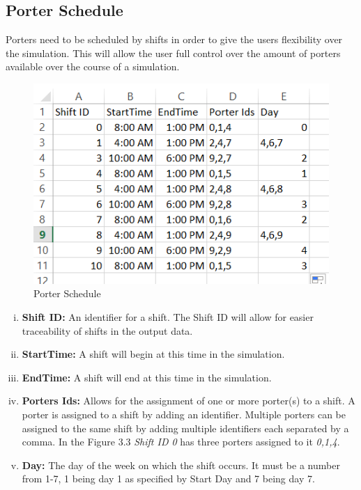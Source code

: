 \documentclass[paper=letter, fontsize=10pt]{scrartcl}
\numberwithin{equation}{section}		%
\numberwithin{figure}{section}			%
\numberwithin{table}{section}				%
\begin{document}
	\subsection{Porter Schedule}
	Porters need to be scheduled by shifts in order to give the users flexibility over the simulation.  This will allow the user full control over the amount of porters available over the course of a simulation.
	
	\begin{figure}[!htbp]
	\begin{center}
		\includegraphics[width=1\columnwidth, height=0.5\textheight, keepaspectratio]{Schedule.png}
		\caption{Porter Schedule}
	\end{center}
	\end{figure}
	
	\begin{enumerate}[(i)]
		\item \textbf{Shift ID:} An identifier for a shift.  The Shift ID will allow for easier traceability of shifts in the output data.
		\item \textbf{StartTime:} A shift will begin at this time in the simulation.
		\item \textbf{EndTime:} A shift will end at this time in the simulation.
		\item \textbf{Porters Ids:} Allows for the assignment of one or more porter(s) to a shift.  A porter is assigned to a shift by adding an identifier.  Multiple porters can be assigned to the same shift by adding multiple identifiers each separated by a comma.  In the Figure 3.3 \textit{Shift ID 0} has three  porters assigned to it \textit{0,1,4}.
		\item \textbf{Day:} The day of the week on which the shift occurs.  It must be a number from 1-7, 1 being day 1 as specified by Start Day and 7 being day 7.
	\end{enumerate}
\end{document}
